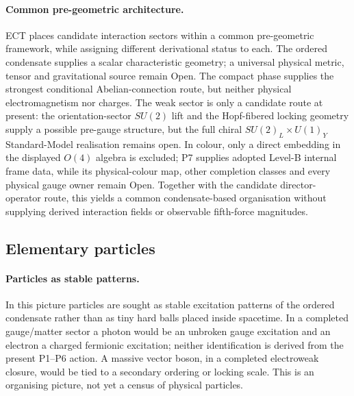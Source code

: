 \documentclass[11pt,a4paper]{article}
\begin{document}
\paragraph{Common pre-geometric architecture.}
ECT places candidate interaction sectors within a common pre-geometric framework, while assigning different derivational status to each.  The ordered condensate supplies a scalar characteristic geometry; a universal physical metric, tensor and gravitational source remain Open.  The compact phase supplies the strongest conditional Abelian-connection route, but neither physical electromagnetism nor charges. The weak sector is only a candidate route at present: the orientation-sector $SU(2)$ lift and the Hopf-fibered locking geometry supply a possible pre-gauge structure, but the full chiral $SU(2)_L\times U(1)_Y$ Standard-Model realisation remains open.  In colour, only a direct embedding in the displayed $O(4)$ algebra is excluded; P7 supplies adopted Level-B internal frame data, while its physical-colour map, other completion classes and every physical gauge owner remain Open.  Together with the candidate director-operator route, this yields a common condensate-based organisation without supplying derived interaction fields or observable fifth-force magnitudes.

\subsection{Elementary particles}

\paragraph{Particles as stable patterns.}
In this picture particles are sought as stable excitation patterns of the ordered condensate rather than as tiny hard balls placed inside spacetime.  In a completed gauge/matter sector a photon would be an unbroken gauge excitation and an electron a charged fermionic excitation; neither identification is derived from the present P1--P6 action.  A massive vector boson, in a completed electroweak closure, would be tied to a secondary ordering or locking scale.  This is an organising picture, not yet a census of physical particles.
\end{document}
